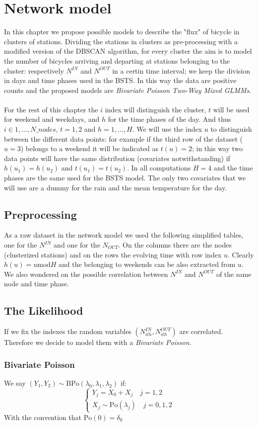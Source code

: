 \documentclass[11pt,twoside]{report}
\begin{document}
\chapter{Network model}
In this chapter we propose possible models to describe the "flux" of bicycle in clusters of stations. Dividing the stations in clusters as pre-processing with a modified version of the DBSCAN algorithm, for every cluster the aim is to model the number of bicycles arriving and departing at stations belonging to the cluster: respectively $N^{IN}$ and $N^{OUT}$ in a certin time interval; we keep the division in days and time phases used in the BSTS. In this way the data are positive counts and the proposed models are \emph{Bivariate Poisson Two-Way Mixed GLMMs}.\\
\\
For the rest of this chapter the $i$ index will distinguish the cluster, $t$ will be used for weekend and weekdays, and $h$ for the time phases of the day. And thus $i \in 1,...,N\_nodes$, $t = 1,2$ and $h = 1,...,H$. We will use the index $u$ to distinguish between the different data points: for example if the third row of the dataset ($u=3$) belongs to a weekend it will be indicated as $t(u)=2$; in this way two data points will have the same distribution (covariates notwithstanding) if $h(u_1) = h(u_2)$ and $t(u_1)=t(u_2)$. In all computations $H=4$ and the time phases are the same used for the BSTS model.
The only two covariates that we will use are a dummy for the rain and the mean temperature for the day.
\section{Preprocessing}
As a raw dataset in the network model we used the following simplified tables, one for the $N^{IN}$ and one for the $N_{OUT}$. On the columns there are the nodes (clusterized stations) and on the rows the evolving time with row index $u$. Clearly $h(u) = u \mathrm{mod} H$ and the belonging to weekends can be also extracted from $u$. We also wondered on the possible correlation between $N^{IN}$ and $N^{OUT}$ of the same node and time phase. 

\section{The Likelihood}
If we fix the indexes the random variables $(N^{IN}_{ith}, N^{OUT}_{ith})$ are	correlated. Therefore we decide to model them with a \emph{Bivariate Poisson}.
\subsection{Bivariate Poisson}
We say $(Y_1,Y_2) \sim \mathrm{BPo}(\lambda_0, \lambda_1, \lambda_2)$ if:
\begin{equation}
\begin{cases}
Y_j = X_0 + X_j \quad j = 1,2\\
X_j \sim \mathrm{Po}(\lambda_j) \quad j = 0,1,2
\end{cases}
\end{equation}
With the convention that $\mathrm{Po}(0) = \delta_0$
\end{document}
